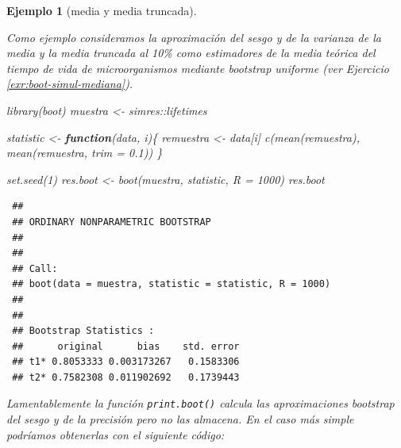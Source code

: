 \documentclass[
]{book}
\newenvironment{Shaded}{\begin{snugshade}}{\end{snugshade}}
\newcommand{\AttributeTok}[1]{\textcolor[rgb]{0.77,0.63,0.00}{#1}}
\newcommand{\ControlFlowTok}[1]{\textcolor[rgb]{0.13,0.29,0.53}{\textbf{#1}}}
\newcommand{\DecValTok}[1]{\textcolor[rgb]{0.00,0.00,0.81}{#1}}
\newcommand{\FloatTok}[1]{\textcolor[rgb]{0.00,0.00,0.81}{#1}}
\newcommand{\FunctionTok}[1]{\textcolor[rgb]{0.00,0.00,0.00}{#1}}
\newcommand{\NormalTok}[1]{#1}
\newcommand{\OtherTok}[1]{\textcolor[rgb]{0.56,0.35,0.01}{#1}}
\newcommand{\SpecialCharTok}[1]{\textcolor[rgb]{0.00,0.00,0.00}{#1}}
\theoremstyle{break}
\newtheorem{example}{Ejemplo}[chapter]
\theoremstyle{nonumberplain}
\begin{document}
\begin{example}[media y media truncada]
\protect\hypertarget{exm:boot-simul-sesgo-var}{}\label{exm:boot-simul-sesgo-var}

Como ejemplo consideramos la aproximación del sesgo y de la varianza de la media y la media truncada al 10\% como estimadores de la media teórica del tiempo de vida de microorganismos mediante bootstrap uniforme (ver Ejercicio \ref{exr:boot-simul-mediana}).

\begin{Shaded}
\begin{Highlighting}[]
\FunctionTok{library}\NormalTok{(boot)}
\NormalTok{muestra }\OtherTok{\textless{}{-}}\NormalTok{ simres}\SpecialCharTok{::}\NormalTok{lifetimes}

\NormalTok{statistic }\OtherTok{\textless{}{-}} \ControlFlowTok{function}\NormalTok{(data, i)\{}
\NormalTok{  remuestra }\OtherTok{\textless{}{-}}\NormalTok{ data[i]}
  \FunctionTok{c}\NormalTok{(}\FunctionTok{mean}\NormalTok{(remuestra), }\FunctionTok{mean}\NormalTok{(remuestra, }\AttributeTok{trim =} \FloatTok{0.1}\NormalTok{))}
\NormalTok{\}}

\FunctionTok{set.seed}\NormalTok{(}\DecValTok{1}\NormalTok{)}
\NormalTok{res.boot }\OtherTok{\textless{}{-}} \FunctionTok{boot}\NormalTok{(muestra, statistic, }\AttributeTok{R =} \DecValTok{1000}\NormalTok{)}
\NormalTok{res.boot}
\end{Highlighting}
\end{Shaded}

\begin{verbatim}
 ## 
 ## ORDINARY NONPARAMETRIC BOOTSTRAP
 ## 
 ## 
 ## Call:
 ## boot(data = muestra, statistic = statistic, R = 1000)
 ## 
 ## 
 ## Bootstrap Statistics :
 ##      original      bias    std. error
 ## t1* 0.8053333 0.003173267   0.1583306
 ## t2* 0.7582308 0.011902692   0.1739443
\end{verbatim}

Lamentablemente la función \texttt{print.boot()} calcula las aproximaciones bootstrap del sesgo y de la precisión pero no las almacena.
En el caso más simple podríamos obtenerlas con el siguiente código:


\end{example}
\end{document}
